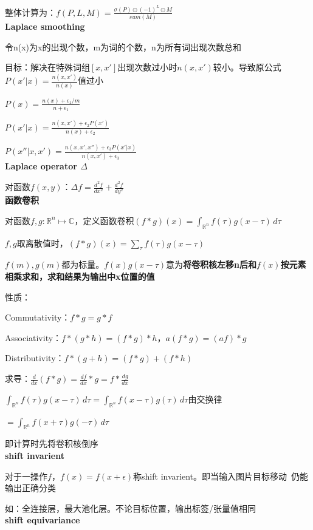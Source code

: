 \documentclass[UTF8]{ctexart}
\begin{document}
  整体计算为：$f(P, L, M) = \frac{\sigma(P) \odot (-1)^L \odot M}{sum(M)}$\\
\textbf{Laplace smoothing}

  令n(x)为x的出现个数，m为词的个数，n为所有词出现次数总和
  
  \quad 目标：解决在特殊词组$[x, x']$出现次数过小时$n(x, x')$较小。导致原公式$P(x' | x) = \frac{n(x, x')}{n(x)}$值过小
    
  $P(x) = \frac{n(x) + \epsilon_1 / m}{n + \epsilon_1}$

  $P(x' | x) = \frac{n(x, x') + \epsilon_2 P(x')}{n(x) + \epsilon_2}$

  $P(x'' | x, x') = \frac{n(x, x', x'') + \epsilon_3 P(x' | x)}{n(x, x') + \epsilon_3}$\\
\textbf{Laplace operator $\Delta$}

  对函数$f(x, y)$：$\Delta f = \frac{d^2f}{dx^2} + \frac{d^2f}{dy^2}$\\
\textbf{函数卷积}

  对函数$f, g : \mathbb{R}^n \mapsto \mathbb{C}$，定义函数卷积$(f * g)(x) = \int_{\mathbb{R}^n} f(\tau)g(x - \tau) \,d\tau$

  \quad $f, g$取离散值时，$(f * g)(x) = \sum_\tau f(\tau)g(x - \tau)$

  \quad $f(m), g(m)$都为标量。$f(x)g(x - \tau)$意为\textbf{将卷积核左移n后和$f(x)$按元素相乘求和，求和结果为输出中x位置的值}

  性质：

  \quad Commutativity：$f * g = g * f$
  
  \quad Associativity：$f * (g * h) = (f * g) * h$，$a(f * g) = (af) * g$
  
  \quad Distributivity：$f * (g + h) = (f * g) + (f * h)$
  
  \quad 求导：$\frac{d }{dx}(f * g) = \frac{d f}{dx} * g = f * \frac{dg}{dx}$
  
  \quad $\int_{\mathbb{R}^n} f(\tau)g(x - \tau) \,d\tau = \int_{\mathbb{R}^n} f(x - \tau)g(\tau) \,d\tau$由交换律
  
  \quad \quad $ = \int_{\mathbb{R}^n} f(x + \tau)g(-\tau) \,d\tau$
  
  \quad \quad 即计算时先将卷积核倒序\\
\textbf{shift invarient}

  对于一操作$f$，$f(x) = f(x + \epsilon)$称shift invarient。即当输入图片目标移动\ 仍能输出正确分类
  
  如：全连接层，最大池化层。不论目标位置，输出标签/张量值相同\\
\textbf{shift equivariance}
\end{document}
